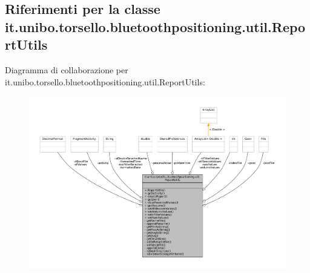 \hypertarget{classit_1_1unibo_1_1torsello_1_1bluetoothpositioning_1_1util_1_1ReportUtils}{}\subsection{Riferimenti per la classe it.\+unibo.\+torsello.\+bluetoothpositioning.\+util.\+Report\+Utils}
\label{classit_1_1unibo_1_1torsello_1_1bluetoothpositioning_1_1util_1_1ReportUtils}


Diagramma di collaborazione per it.\+unibo.\+torsello.\+bluetoothpositioning.\+util.\+Report\+Utils\+:
\nopagebreak
\begin{figure}[H]
\begin{center}
\leavevmode
\includegraphics[width=350pt]{classit_1_1unibo_1_1torsello_1_1bluetoothpositioning_1_1util_1_1ReportUtils__coll__graph}
\end{center}
\end{figure}
